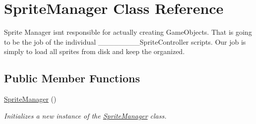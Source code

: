 \hypertarget{class_sprite_manager}{}\section{Sprite\+Manager Class Reference}
\label{class_sprite_manager}


Sprite Manager isn\textquotesingle{}t responsible for actually creating Game\+Objects. That is going to be the job of the individual \+\_\+\+\_\+\+\_\+\+\_\+\+\_\+\+\_\+\+\_\+\+\_\+\+Sprite\+Controller scripts. Our job is simply to load all sprites from disk and keep the organized.  


\subsection*{Public Member Functions}
\begin{DoxyCompactItemize}
\item 
\hyperlink{class_sprite_manager_a2bd7ba7f252b047b5c606a89e7a27d01}{Sprite\+Manager} ()
\begin{DoxyCompactList}\small\item\em Initializes a new instance of the \hyperlink{class_sprite_manager}{Sprite\+Manager} class. \end{DoxyCompactList}\end{DoxyCompactItemize}
